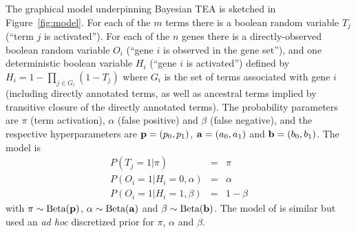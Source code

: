 The graphical model underpinning Bayesian TEA is sketched in Figure~\ref{fig:model}.
For each of the $m$ terms there
is a boolean random variable
$T_j$ (``term $j$ is activated'').
For each of the $n$ genes there is a directly-observed boolean random variable
$O_i$ (``gene $i$ is observed in the gene set''),
and one deterministic boolean variable
$H_i$ (``gene $i$ is activated'')
defined by $H_i = 1 - \prod_{j \in G_i} (1 - T_j)$
where $G_i$ is the set of terms associated with gene $i$
(including directly annotated terms, as well as ancestral terms implied by transitive closure of the directly annotated terms).
The probability parameters are $\pi$ (term activation), $\alpha$ (false positive) and $\beta$ (false negative),
and the respective hyperparameters are ${\bf p}=(p_0,p_1)$, ${\bf a}=(a_0,a_1)$ and ${\bf b}=(b_0,b_1)$.
The model is
\begin{eqnarray*}
P(T_j=1|\pi) & = & \pi \\
P(O_i=1|H_i=0,\alpha) & = & \alpha \\
P(O_i=1|H_i=1,\beta) & = & 1-\beta
\end{eqnarray*}
with
$\pi \sim \mbox{Beta}({\bf p})$,
$\alpha \sim \mbox{Beta}({\bf a})$ and
$\beta \sim \mbox{Beta}({\bf b})$.
The model of \cite{pmid20172960} is similar but used an
{\em ad hoc} discretized prior for $\pi$, $\alpha$ and $\beta$.

